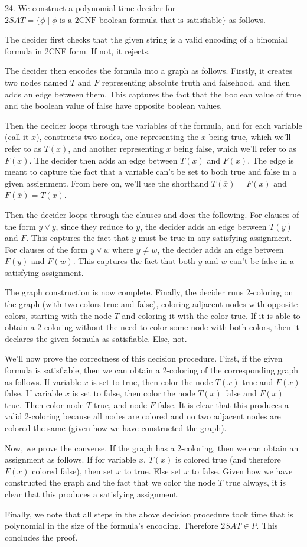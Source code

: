 \documentclass{article}
\begin{document}
24. We construct a polynomial time decider for $2SAT = \{\phi \mid \phi \text{ is a 2CNF boolean formula that is satisfiable}\}$ as follows.

The decider first checks that the given string is a valid encoding of a binomial formula in 2CNF form. If not, it rejects.

The decider then encodes the formula into a graph as follows. Firstly, it creates two nodes named $T$ and $F$ representing absolute truth and falsehood, and then adds an edge between them. This captures the fact that the boolean value of true and the boolean value of false have opposite boolean values.

Then the decider loops through the variables of the formula, and for each variable (call it $x$), constructs two nodes, one representing the $x$ being true, which we'll refer to as $T(x)$, and another representing $x$ being false, which we'll refer to as $F(x)$. The decider then adds an edge between $T(x)$ and $F(x)$. The edge is meant to capture the fact that a variable can't be set to both true and false in a given assignment. From here on, we'll use the shorthand $T(\overline{x}) = F(x)$ and $F(\overline{x}) = T(x)$.

Then the decider loops through the clauses and does the following. For clauses of the form $y \lor y$, since they reduce to $y$, the decider adds an edge between $T(y)$ and $F$. This captures the fact that $y$ must be true in any satisfying assignment. For clauses of the form $y \lor w$ where $y \ne w$, the decider adds an edge between $F(y)$ and $F(w)$. This captures the fact that both $y$ and $w$ can't be false in a satisfying assignment.

The graph construction is now complete. Finally, the decider runs 2-coloring on the graph (with two colors true and false), coloring adjacent nodes with opposite colors, starting with the node $T$ and coloring it with the color true. If it is able to obtain a 2-coloring without the need to color some node with both colors, then it declares the given formula as satisfiable. Else, not.

We'll now prove the correctness of this decision procedure. First, if the given formula is satisfiable, then we can obtain a 2-coloring of the corresponding graph as follows. If variable $x$ is set to true, then color the node $T(x)$ true and $F(x)$ false. If variable $x$ is set to false, then color the node $T(x)$ false and $F(x)$ true. Then color node $T$ true, and node $F$ false. It is clear that this produces a valid 2-coloring because all nodes are colored and no two adjacent nodes are colored the same (given how we have constructed the graph).

Now, we prove the converse. If the graph has a 2-coloring, then we can obtain an assignment as follows. If for variable $x$, $T(x)$ is colored true (and therefore $F(x)$ colored false), then set $x$ to true. Else set $x$ to false. Given how we have constructed the graph and the fact that we color the node $T$ true always, it is clear that this produces a satisfying assignment.

Finally, we note that all steps in the above decision procedure took time that is polynomial in the size of the formula's encoding. Therefore $2SAT \in P$. This concludes the proof.
\end{document}
